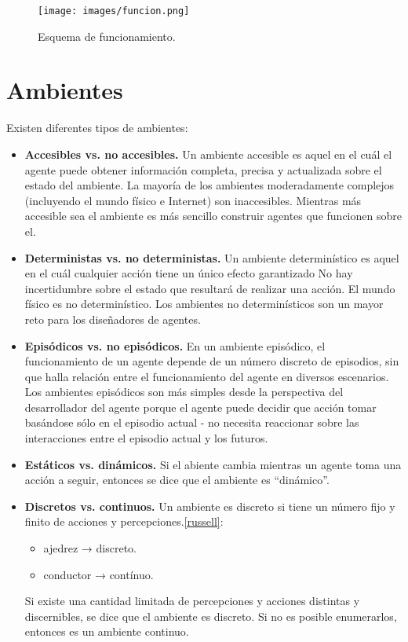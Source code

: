 \documentclass[a4paper,12pt,oneside]{book}
\begin{document}
\begin{figure}[!h]
  \centering
  \texttt{[image: images/funcion.png]}
  \caption{Esquema de funcionamiento.}
\end{figure}

\section{Ambientes}
Existen diferentes tipos de ambientes:
\begin{itemize}
\item {\bf Accesibles vs. no accesibles.}
Un ambiente accesible es aquel en el cuál el agente puede
obtener información completa, precisa y actualizada sobre el
estado del ambiente. La mayoría de los ambientes
moderadamente complejos (incluyendo el mundo físico e
Internet) son inaccesibles. Mientras más accesible sea el
ambiente es más sencillo construir agentes que funcionen sobre el.

\item {\bf Deterministas vs. no deterministas.}
  Un ambiente determinístico es aquel en el cuál cualquier acción tiene un
único efecto garantizado No hay incertidumbre sobre el estado que
resultará de realizar una acción. El mundo físico es no
determinístico. Los ambientes no determinísticos son un mayor reto
para los diseñadores de agentes.

\item {\bf Episódicos vs. no episódicos.}
 En un ambiente episódico, el funcionamiento de un agente depende de
 un número discreto de episodios, sin que halla relación entre el
 funcionamiento del agente en diversos escenarios. Los ambientes episódicos son
más simples desde la perspectiva del desarrollador del agente porque
el agente puede decidir que acción tomar basándose sólo en el episodio
actual - no necesita reaccionar sobre las interacciones entre el episodio actual y los futuros.

\item {\bf Estáticos vs. dinámicos.} Si el abiente cambia mientras un
  agente toma una acción a seguir, entonces se dice que el ambiente es
  ``dinámico''. 
\item {\bf Discretos vs. continuos.}                         
Un ambiente es discreto si tiene un número fijo y finito de acciones y
percepciones.\ref{russell}:
\begin{itemize}
   \item ajedrez → discreto.
    \item conductor → contínuo.
  \end{itemize}
 Si existe una cantidad limitada de
  percepciones y acciones distintas y discernibles, se dice que el
  ambiente es discreto. Si no es posible enumerarlos, entonces es un
  ambiente continuo.
\end{itemize}
\end{document}
